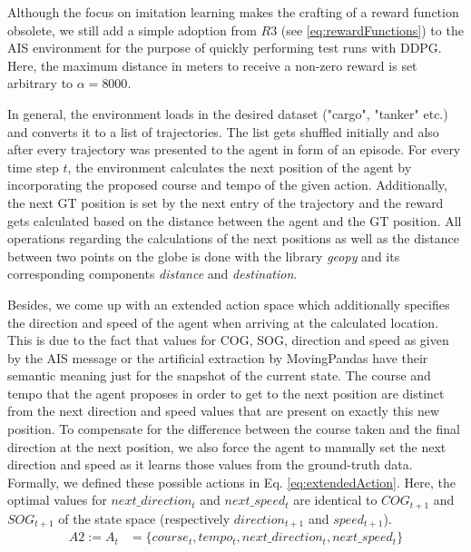 Although the focus on imitation learning makes the crafting of a reward function obsolete, we still add a simple adoption from $R3$ (see \ref{eq:rewardFunctions}) to the AIS environment for the purpose of quickly performing test runs with DDPG. Here, the maximum distance in meters to receive a non-zero reward is set arbitrary to $\alpha=8000$.
\par
In general, the environment loads in the desired dataset ("cargo", "tanker" etc.) and converts it to a list of trajectories. The list gets shuffled initially and also after every trajectory was presented to the agent in form of an episode. For every time step $t$, the environment calculates the next position of the agent by incorporating the proposed course and tempo of the given action. Additionally, the next GT position is set by the next entry of the trajectory and the reward gets calculated based on the distance between the agent and the GT position. All operations regarding the calculations of the next positions as well as the distance between two points on the globe is done with the library \textit{geopy} and its corresponding components \textit{distance} and \textit{destination}.
\par
Besides, we come up with an extended action space which additionally specifies the direction and speed of the agent when arriving at the calculated location. This is due to the fact that values for COG, SOG, direction and speed as given by the AIS message or the artificial extraction by MovingPandas have their semantic meaning just for the snapshot of the current state. The course and tempo that the agent proposes in order to get to the next position are distinct from the next direction and speed values that are present on exactly this new position. To compensate for the difference between the course taken and the final direction at the next position, we also force the agent to manually set the next direction and speed as it learns those values from the ground-truth data. Formally, we defined these possible actions in Eq.  \ref{eq:extendedAction}. Here, the optimal values for $next\_direction_t$ and $next\_speed_t$ are identical to $COG_{t+1}$ and $SOG_{t+1}$ of the state space (respectively $direction_{t+1}$ and $speed_{t+1}$).
\begin{equation}
\begin{aligned}
    A2 := A_t &= \{course_t, tempo_t, next\_direction_t, next\_speed_t\}
    \end{aligned}
\end{equation} \label{eq:extendedAction}

